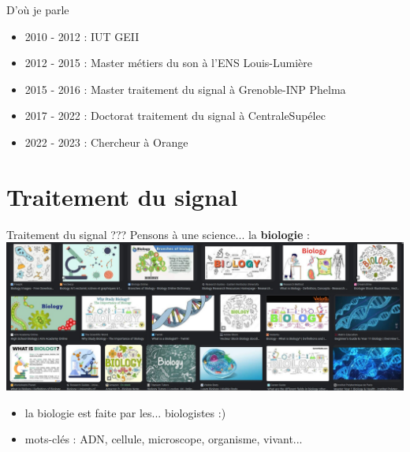 \documentclass[9pt, aspectratio=169]{beamer}
\begin{document}
\begin{frame}{D'où je parle} %
\begin{center}

    \begin{itemize}
        \item 2010 - 2012 : IUT GEII
        \item 2012 - 2015 : Master métiers du son à l'ENS Louis-Lumière
        \item 2015 - 2016 : Master traitement du signal à Grenoble-INP Phelma
        \item 2017 - 2022 : Doctorat traitement du signal à CentraleSupélec
        \item 2022 - 2023 : Chercheur à Orange
    \end{itemize}
\end{center}
\end{frame}


\section{Traitement du signal}

\begin{frame}{} %
\begin{center}
\Huge \insertsection
\end{center}
\end{frame}

\begin{frame}{\og Traitement du signal \fg{} ???} %
Pensons à une science... \pause la \textbf{biologie} :
\pause
\includegraphics[width=\textwidth]{fig/search_results_biology.jpg}
\pause
\begin{itemize}
    \item la biologie est faite par les... biologistes :)
    \item mots-clés : ADN, cellule, microscope, organisme, vivant...
\end{itemize}

\end{frame}
\end{document}
